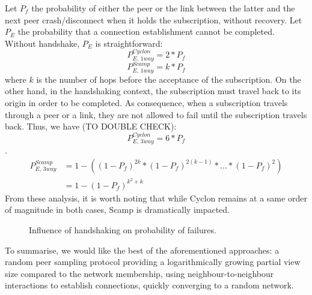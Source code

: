 Let $P_f$ the probability of either the peer or the link between the latter and
the next peer crash/disconnect when it holds the subscription, without
recovery. Let $P_E$ the probability that a connection establishment cannot be
completed. Without handshake, $P_E$ is straightforward:
\begin{equation} P_{E,\,1way}^{Cyclon}=2*P_f \end{equation}
\begin{equation} P_{E,\,1way}^{Scamp}=k*P_f \end{equation} where $k$ is the
number of hops before the acceptance of the subscription. On the other hand, in
the handshaking context, the subscription must travel back to its origin in
order to be completed. As consequence, when a subscription travels through a
peer or a link, they are not allowed to fail until the subscription travels
back. Thus, we have (TO DOUBLE CHECK):
\begin{equation} P_{E,\,3way}^{Cyclon}=6*P_f \end{equation}.
\begin{align} P_{E,\,3way}^{Scamp} &=1 - ((1-P_f)^{2k} * (1-P_f)^{2(k-1)}*
                                     \ldots *(1-P_f)^2) \\
                                   &=1-(1-P_f)^{k^2+k}
\end{align}
From these analysis, it is worth noting that while Cyclon remains at a same
order of magnitude in both cases, Scamp is dramatically impacted.

\begin{figure}
  \centering
  
  \caption{\label{fig:failureexample}Influence of handshaking on probability of
    failures.}
\end{figure}

To summarise, we would like the best of the aforementioned approaches: a random
peer sampling protocol providing a logarithmically growing partial view size
compared to the network membership, using neighbour-to-neighbour interactions
to establish connections, quickly converging to a random network.

